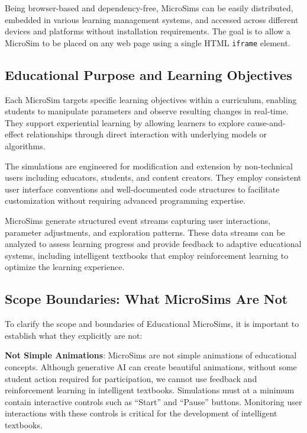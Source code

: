 Being browser-based and dependency-free, MicroSims can be easily distributed, embedded in various learning management systems, and accessed across different devices and platforms without installation requirements. The goal is to allow a MicroSim to be placed on any web page using a single HTML \texttt{iframe} element.

\subsection{Educational Purpose and Learning Objectives}

Each MicroSim targets specific learning objectives within a curriculum, enabling students to manipulate parameters and observe resulting changes in real-time. They support experiential learning by allowing learners to explore cause-and-effect relationships through direct interaction with underlying models or algorithms.

The simulations are engineered for modification and extension by non-technical users including educators, students, and content creators. They employ consistent user interface conventions and well-documented code structures to facilitate customization without requiring advanced programming expertise.

MicroSims generate structured event streams capturing user interactions, parameter adjustments, and exploration patterns. These data streams can be analyzed to assess learning progress and provide feedback to adaptive educational systems, including intelligent textbooks that employ reinforcement learning to optimize the learning experience.

\subsection{Scope Boundaries: What MicroSims Are Not}

To clarify the scope and boundaries of Educational MicroSims, it is important to establish what they explicitly are not:

\textbf{Not Simple Animations}: MicroSims are not simple animations of educational concepts. Although generative AI can create beautiful animations, without some student action required for participation, we cannot use feedback and reinforcement learning in intelligent textbooks. Simulations must at a minimum contain interactive controls such as ``Start'' and ``Pause'' buttons. Monitoring user interactions with these controls is critical for the development of intelligent textbooks.


